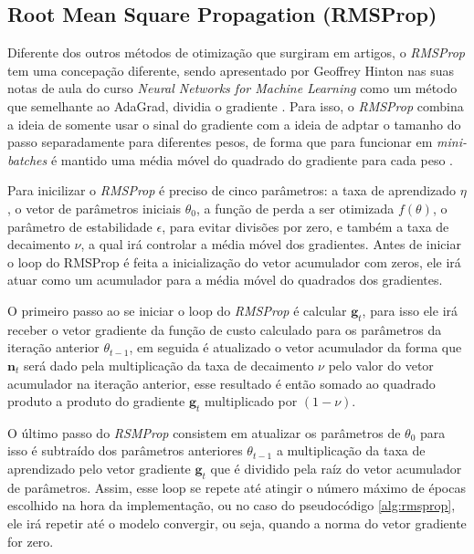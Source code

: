 \subsection{Root Mean Square Propagation (RMSProp)} 

Diferente dos outros métodos de otimização que surgiram em artigos, o \textit{RMSProp} tem uma concepação diferente, sendo apresentado por Geoffrey Hinton nas suas notas de aula do curso \textit{Neural Networks for Machine Learning} como um método que semelhante ao AdaGrad, dividia o gradiente \parencite{RMSPropMethod}. Para isso, o \textit{RMSProp} combina a ideia de somente usar o sinal do gradiente com a ideia de adptar o tamanho do passo separadamente para diferentes pesos, de forma que para funcionar em \textit{mini-batches} é mantido uma média móvel do quadrado do gradiente para cada peso \parencite{RMSPropMethod}.

Para inicilizar o \textit{RMSProp} é preciso de cinco parâmetros: a taxa de aprendizado $\eta$, o vetor de parâmetros iniciais $\theta_0$, a função de perda a ser otimizada $f(\theta)$, o parâmetro de estabilidade $\epsilon$, para evitar divisões por zero, e também a taxa de decaimento $\nu$, a qual irá controlar a média móvel dos gradientes. Antes de iniciar o loop do RMSProp é feita a inicialização do vetor acumulador com zeros, ele irá atuar como um acumulador para a média móvel do quadrados dos gradientes.

O primeiro passo ao se iniciar o loop do \textit{RMSProp} é calcular $\textbf{g}_t$, para isso ele irá receber o vetor gradiente da função de custo calculado para os parâmetros da iteração anterior $\theta_{t-1}$, em seguida é atualizado o vetor acumulador da forma que $\textbf{n}_t$ será dado pela multiplicação da taxa de decaimento $\nu$ pelo valor do vetor acumulador na iteração anterior, esse resultado é então somado ao quadrado produto a produto do gradiente $\textbf{g}_t$ multiplicado por $(1 - \nu)$.

O último passo do \textit{RSMProp} consistem em atualizar os parâmetros de $\theta_0$ para isso é subtraído dos parâmetros anteriores $\theta_{t-1}$ a multiplicação da taxa de aprendizado pelo vetor gradiente $\textbf{g}_t$ que é dividido pela raíz do vetor acumulador de parâmetros. Assim, esse loop se repete até atingir o número máximo de épocas escolhido na hora da implementação, ou no caso do pseudocódigo \ref{alg:rmsprop}, ele irá repetir até o modelo convergir, ou seja, quando a norma do vetor gradiente for zero.

